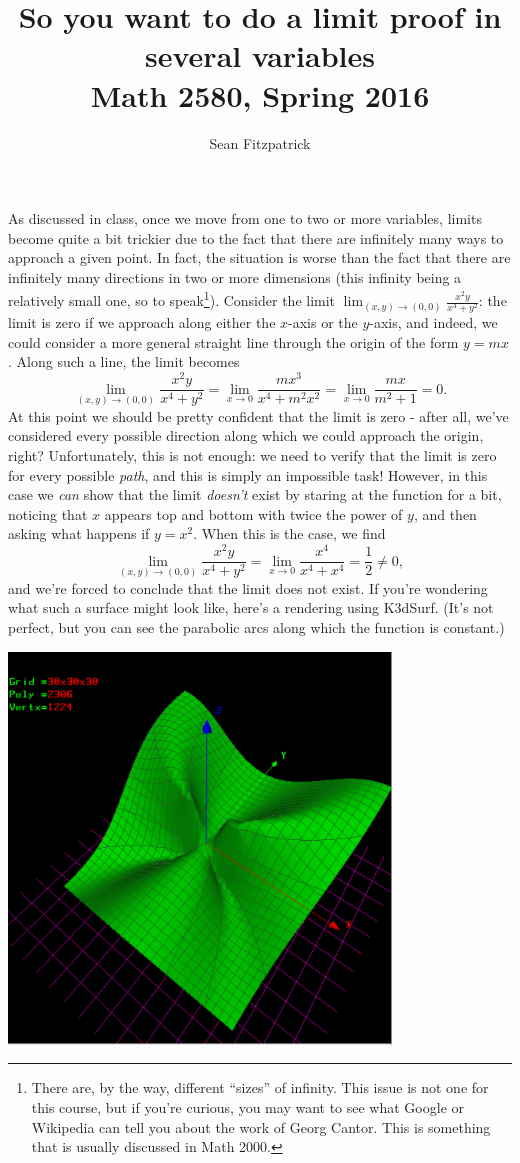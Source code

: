 \documentclass[letterpaper,12pt]{article}
\title{So you want to do a limit proof in several variables\\Math 2580, Spring 2016}
\author{Sean Fitzpatrick}
\newcommand{\di}{\displaystyle}
\begin{document}
\maketitle

As discussed in class, once we move from one to two or more variables, limits become quite a bit trickier due to the fact that there are infinitely many ways to approach a given point. In fact, the situation is worse than the fact that there are infinitely many directions in two or more dimensions (this infinity being a relatively small one, so to speak\footnote{There are, by the way, different ``sizes'' of infinity. This issue is not one for this course, but if you're curious, you may want to see what Google or Wikipedia can tell you about the work of Georg Cantor. This is something that is usually discussed in Math 2000.}). Consider the limit $\di \lim_{(x,y)\to (0,0)}\frac{x^2y}{x^4+y^2}$: the limit is zero if we approach along either the $x$-axis or the $y$-axis, and indeed, we could consider a more general straight line through the origin of the form $y=mx$. Along such a line, the limit becomes
\[
 \lim_{(x,y)\to (0,0)}\frac{x^2y}{x^4+y^2} = \lim_{x\to 0} \frac{mx^3}{x^4+m^2x^2} = \lim_{x\to 0} \frac{mx}{m^2+1} = 0.
\]
At this point we should be pretty confident that the limit is zero - after all, we've considered every possible direction along which we could approach the origin, right? Unfortunately, this is not enough: we need to verify that the limit is zero for every possible {\em path}, and this is simply an impossible task! However, in this case we {\em can} show that the limit {\em doesn't} exist by staring at the function for a bit, noticing that $x$ appears top and bottom with twice the power of $y$, and then asking what happens if $y=x^2$. When this is the case, we find
\[
  \lim_{(x,y)\to (0,0)}\frac{x^2y}{x^4+y^2} = \lim_{x\to 0}\frac{x^4}{x^4+x^4} = \frac{1}{2}\neq 0,
\]
and we're forced to conclude that the limit does not exist. If you're wondering what such a surface might look like, here's a rendering using K3dSurf. (It's not perfect, but you can see the parabolic arcs along which the function is constant.)
\begin{center}
 \includegraphics[width=4in]{parabolic_limit.pdf}
\end{center}
\end{document}
